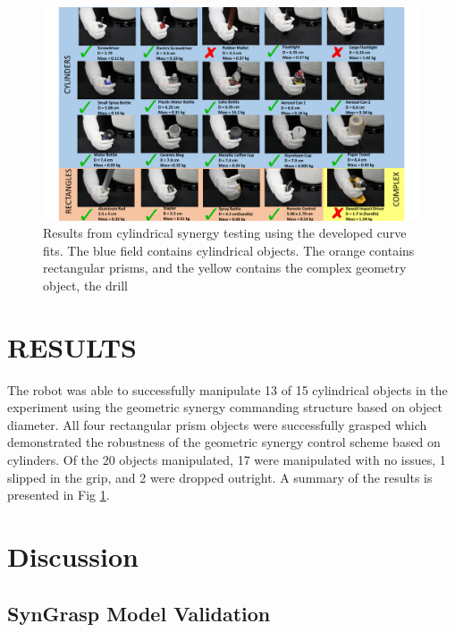 \documentclass[runningheads,a4paper]{llncs}
\begin{document}
\begin{figure}[!b]
  \centering
  \includegraphics[width=1.08\linewidth]{Objects3.pdf}
  \caption{Results from cylindrical synergy testing using the developed curve fits.  The blue field contains cylindrical objects.  The orange contains rectangular prisms, and the yellow contains the complex geometry object, the drill}
  \label{objects} 
\end{figure}

\section{RESULTS}
\label{results}

The robot was able to successfully manipulate 13 of 15 cylindrical objects in the experiment using the geometric synergy commanding structure based on object diameter. All four rectangular prism objects were successfully grasped which demonstrated the robustness of the geometric synergy control scheme based on cylinders. Of the 20 objects manipulated, 17 were manipulated with no issues, 1 slipped in the grip, and 2 were dropped outright. A summary of the results is presented in Fig \ref{objects}.
 

\paragraph{}
\section{Discussion}
\label{discussion}

\subsection{SynGrasp Model Validation}
\end{document}
